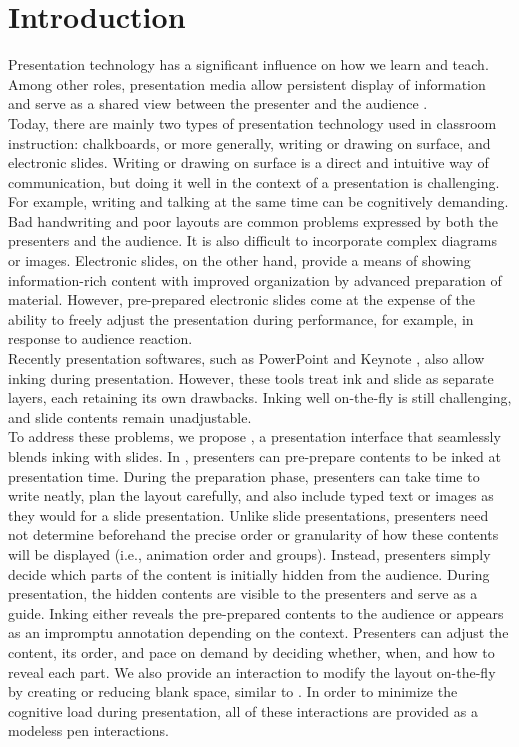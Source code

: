 \section{Introduction}

Presentation technology has a significant influence on how we learn and teach. Among other roles, presentation media allow persistent display of information and serve as a shared view between the presenter and the audience \cite{anderson2004beyond}. \\

Today, there are mainly two types of presentation technology used in classroom instruction: chalkboards, or more generally, writing or drawing on surface, and electronic slides. Writing or drawing on surface is a direct and intuitive way of communication, but doing it well in the context of a presentation is challenging. For example, writing and talking at the same time can be cognitively demanding. Bad handwriting and poor layouts are common problems expressed by both the presenters and the audience. It is also difficult to incorporate complex diagrams or images. Electronic slides, on the other hand, provide a means of showing information-rich content with improved organization by advanced preparation of material. However, pre-prepared electronic slides come at the expense of the ability to freely adjust the presentation during performance, for example, in response to audience reaction. \\

Recently presentation softwares, such as PowerPoint \cite{powerpoint2017} and Keynote \cite{keynote2017}, also allow inking during presentation. However, these tools treat ink and slide as separate layers, each retaining its own drawbacks. Inking well on-the-fly is still challenging, and slide contents remain unadjustable. \\

To address these problems, we propose \interface, a presentation interface that seamlessly blends inking with slides. In \interface, presenters can pre-prepare contents to be inked at presentation time. During the preparation phase, presenters can take time to write neatly, plan the layout carefully, and also include typed text or images as they would for a slide presentation. Unlike slide presentations, presenters need not determine beforehand the precise order or granularity of how these contents will be displayed (i.e., animation order and groups). Instead, presenters simply decide which parts of the content is initially hidden from the audience. During presentation, the hidden contents are visible to the presenters and serve as a guide. Inking either reveals the pre-prepared contents to the audience or appears as an impromptu annotation depending on the context. Presenters can adjust the content, its order, and pace on demand by deciding whether, when, and how to reveal each part. We also provide an interaction to modify the layout on-the-fly by creating or reducing blank space, similar to \cite{yoon2013texttearing}. In order to minimize the cognitive load during presentation, all of these interactions are provided as a modeless pen interactions. \\


